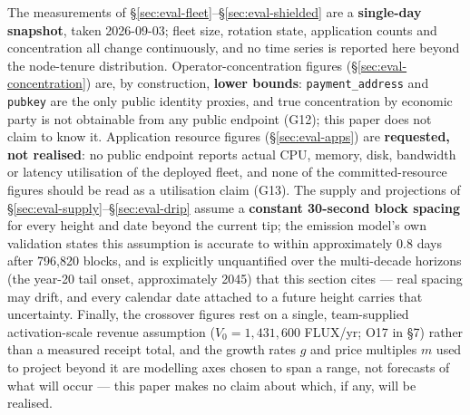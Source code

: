 The measurements of \S\ref{sec:eval-fleet}--\S\ref{sec:eval-shielded} are a \textbf{single-day
snapshot}, taken 2026-09-03; fleet size, rotation state, application counts and concentration all
change continuously, and no time series is reported here beyond the node-tenure distribution.
Operator-concentration figures (\S\ref{sec:eval-concentration}) are, by construction, \textbf{lower
bounds}: \texttt{payment\_address} and \texttt{pubkey} are the only public identity proxies, and
true concentration by economic party is not obtainable from any public endpoint (G12); this paper
does not claim to know it. Application resource figures (\S\ref{sec:eval-apps}) are
\textbf{requested, not realised}: no public endpoint reports actual CPU, memory, disk, bandwidth or
latency utilisation of the deployed fleet, and none of the committed-resource figures should be
read as a utilisation claim (G13). The supply and \PNR projections of
\S\ref{sec:eval-supply}--\S\ref{sec:eval-drip} assume a \textbf{constant 30-second block spacing}
for every height and date beyond the current tip; the emission model's own validation states this
assumption is accurate to within approximately 0.8 days after 796,820 blocks, and is explicitly
unquantified over the multi-decade horizons (the year-20 tail onset, approximately 2045) that this
section cites — real \PoN spacing may drift, and every calendar date attached to a future height
carries that uncertainty. Finally, the \PNR crossover figures rest on a single, team-supplied
activation-scale revenue assumption ($V_0 = 1{,}431{,}600$ FLUX/yr; O17 in \S7) rather than a
measured receipt total, and the growth rates $g$ and price multiples $m$ used to project beyond it
are modelling axes chosen to span a range, not forecasts of what will occur — this paper makes no
claim about which, if any, will be realised.

\FloatBarrier
